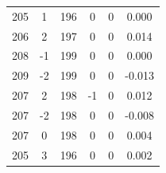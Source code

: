 \documentclass[a4paper, 12pt]{article}
\begin{document}
\begin{table}[H]
\begin{tabular}{@{}cccccc@{}}
    205                   & 1                     & 196               & 0                 & 0                 & 0.000               \\
    206                   & 2                     & 197               & 0                 & 0                 & 0.014               \\
    208                   & -1                    & 199               & 0                 & 0                 & 0.000               \\
    209                   & -2                    & 199               & 0                 & 0                 & -0.013              \\
    207                   & 2                     & 198               & -1                & 0                 & 0.012               \\
    207                   & -2                    & 198               & 0                 & 0                 & -0.008              \\
    207                   & 0                     & 198               & 0                 & 0                 & 0.004               \\
    205                   & 3                     & 196               & 0                 & 0                 & 0.002               \\ \bottomrule
    \end{tabular}
    \end{table}
    
\end{document}
